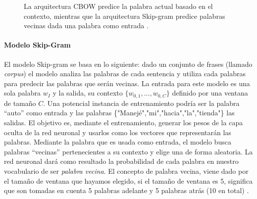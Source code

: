 \begin{figure}
	\def\svgwidth{\linewidth}
	
	\caption{La arquitectura CBOW predice la palabra actual basado en el contexto, mientras que la arquitectura Skip-gram predice palabras vecinas dada una palabra como entrada \citep{mikolov2013efficient}.}
\end{figure}

\paragraph{Modelo Skip-Gram}
El modelo Skip-gram se basa en lo siguiente: dado un conjunto de frases (llamado \textit{corpus}) el modelo analiza las palabras de cada sentencia y utiliza cada palabras para predecir las palabras que serán vecinas. La entrada para este modelo es una sola palabra \(w_I\) y la salida, su contexto \(\{w_{0,1},..., w_{0,C}\}\) definido por una ventana de tamaño \(C\). Una potencial instancia de entrenamiento podría ser la palabra “auto” como entrada y las palabras \{"Manejé","mi","hacia","la","tienda"\} las salidas. El objetivo es, mediante el entrenamiento, generar los pesos de la capa oculta de la red neuronal y usarlos como los vectores que representarán las palabras. Mediante la palabra que es usada como entrada, el modelo busca palabras “vecinas” pertenecientes a su contexto y elige una de forma aleatoria. La red neuronal dará como resultado la probabilidad de cada palabra en nuestro vocabulario de ser \textit{palabra vecina}. El concepto de palabra vecina, viene dado por el tamaño de ventana que hayamos elegido, si el tamaño de ventana es 5, significa que son tomadas en cuenta 5 palabras adelante y 5 palabras atrás (10 en total) \citep{skipgrammodel}. 

